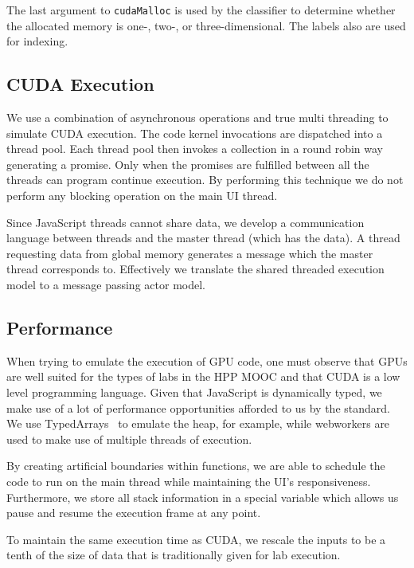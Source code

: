 \documentclass[nocopyrightspace]{sigchi}
\begin{document}
The last argument to {\tt cudaMalloc} is used by the classifier to
determine whether the allocated memory is one-, two-, or three-dimensional. The labels also are used for indexing.

\subsection{CUDA Execution}


We use a combination of asynchronous operations and true multi threading
to simulate CUDA execution. The code kernel invocations are dispatched
into a thread pool. Each thread pool then invokes a collection in a 
round robin way generating a promise. Only when the promises are fulfilled
between all the threads can program continue execution. By performing
this technique we do not perform any blocking operation on the main UI
thread.

Since JavaScript threads cannot share data, we develop a communication
language between threads and the master thread (which has the data). A
thread requesting data from global memory generates a message which the
master thread corresponds to. Effectively we translate the shared threaded
execution model to a message passing actor model.

\subsection{Performance}

When trying to emulate the execution of GPU code, one must observe that GPUs
are well suited for the types of labs in the HPP MOOC and that CUDA is a 
low level programming language. Given that JavaScript is dynamically typed,
we make use of a lot of performance opportunities afforded to us by the standard.
We use TypedArrays~\cite{guha2010essence,maffeis2008operational} to emulate the heap,
for example, while webworkers are used
to make use of multiple threads of execution.

By creating artificial boundaries within functions, we are able to schedule
the code to run on the main thread while maintaining the UI's responsiveness.
Furthermore, we store all stack information in a special variable which 
allows us pause and resume the execution frame at any point.

To maintain the same execution time as CUDA, we rescale the inputs to be a
tenth of the size of data that is traditionally given for lab execution.
\end{document}
